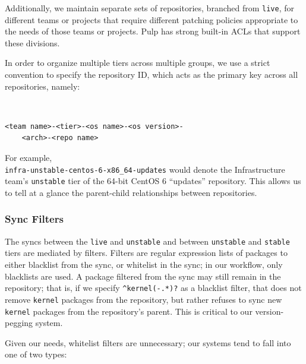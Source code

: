 Additionally, we maintain separate sets of repositories, branched
from \texttt{live}, for different teams or projects that require
different patching policies appropriate to the needs of those teams or
projects.  Pulp has strong built-in ACLs that support these divisions.

In order to organize multiple tiers across multiple groups, we use a
strict convention to specify the repository ID, which acts as the
primary key across all repositories, namely:

{\tt \small
\begin{verbatim}
<team name>-<tier>-<os name>-<os version>-
    <arch>-<repo name>
\end{verbatim}
}

For example,\\
\texttt{infra-unstable-centos-6-x86\_64-updates} would
denote the Infrastructure team's \texttt{unstable} tier of the 64-bit
CentOS 6 ``updates'' repository.  This allows us to tell at a glance
the parent-child relationships between repositories.

\subsubsection{Sync Filters}

The syncs between the \texttt{live} and \texttt{unstable} and between
\texttt{unstable} and \texttt{stable} tiers are mediated by
filters.  Filters are regular
expression lists of packages to either blacklist from the sync, or
whitelist in the sync; in our workflow, only blacklists are used.  A
package filtered from the sync may still remain in the repository;
that is, if we specify \texttt{\^{}kernel(-.*)?} as a blacklist filter,
that does not remove \texttt{kernel} packages from the repository, but
rather refuses to sync new \texttt{kernel} packages from the
repository's parent.  This is critical to our version-pegging system.

Given our needs, whitelist filters are unnecessary; our systems tend
to fall into one of two types:

